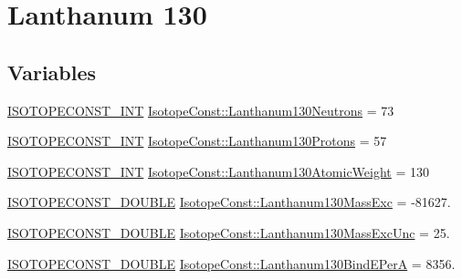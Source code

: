 \hypertarget{group___isotope_const-_lanthanum-_la130}{}\section{Lanthanum 130}
\label{group___isotope_const-_lanthanum-_la130}
\subsection*{Variables}
\begin{DoxyCompactItemize}
\item 
\mbox{\hyperlink{group___isotope_const-_macros_ga5f18360b3e99483a35c32d789e62621c}{I\+S\+O\+T\+O\+P\+E\+C\+O\+N\+S\+T\+\_\+\+I\+NT}} \mbox{\hyperlink{group___isotope_const-_lanthanum-_la130_ga3d498c381437c4ffa574312b6012c5a6}{Isotope\+Const\+::\+Lanthanum130\+Neutrons}} = 73
\item 
\mbox{\hyperlink{group___isotope_const-_macros_ga5f18360b3e99483a35c32d789e62621c}{I\+S\+O\+T\+O\+P\+E\+C\+O\+N\+S\+T\+\_\+\+I\+NT}} \mbox{\hyperlink{group___isotope_const-_lanthanum-_la130_ga0ddd321c267a9c8ec8af3cb6695f8a67}{Isotope\+Const\+::\+Lanthanum130\+Protons}} = 57
\item 
\mbox{\hyperlink{group___isotope_const-_macros_ga5f18360b3e99483a35c32d789e62621c}{I\+S\+O\+T\+O\+P\+E\+C\+O\+N\+S\+T\+\_\+\+I\+NT}} \mbox{\hyperlink{group___isotope_const-_lanthanum-_la130_ga3e22be0678e37a3e1796c0858b0c382f}{Isotope\+Const\+::\+Lanthanum130\+Atomic\+Weight}} = 130
\item 
\mbox{\hyperlink{group___isotope_const-_macros_ga8f45a7272ce02c0b4c65c44636ed719a}{I\+S\+O\+T\+O\+P\+E\+C\+O\+N\+S\+T\+\_\+\+D\+O\+U\+B\+LE}} \mbox{\hyperlink{group___isotope_const-_lanthanum-_la130_ga249bced2b103540bc4a73bc37ecb31fc}{Isotope\+Const\+::\+Lanthanum130\+Mass\+Exc}} = -\/81627.
\item 
\mbox{\hyperlink{group___isotope_const-_macros_ga8f45a7272ce02c0b4c65c44636ed719a}{I\+S\+O\+T\+O\+P\+E\+C\+O\+N\+S\+T\+\_\+\+D\+O\+U\+B\+LE}} \mbox{\hyperlink{group___isotope_const-_lanthanum-_la130_gac2460272e20d421691daaa5178273ad5}{Isotope\+Const\+::\+Lanthanum130\+Mass\+Exc\+Unc}} = 25.
\item 
\mbox{\hyperlink{group___isotope_const-_macros_ga8f45a7272ce02c0b4c65c44636ed719a}{I\+S\+O\+T\+O\+P\+E\+C\+O\+N\+S\+T\+\_\+\+D\+O\+U\+B\+LE}} \mbox{\hyperlink{group___isotope_const-_lanthanum-_la130_ga79a578b0edc1eef10d044ae0e0d66bbc}{Isotope\+Const\+::\+Lanthanum130\+Bind\+E\+PerA}} = 8356.
\item 

\end{DoxyCompactItemize}
